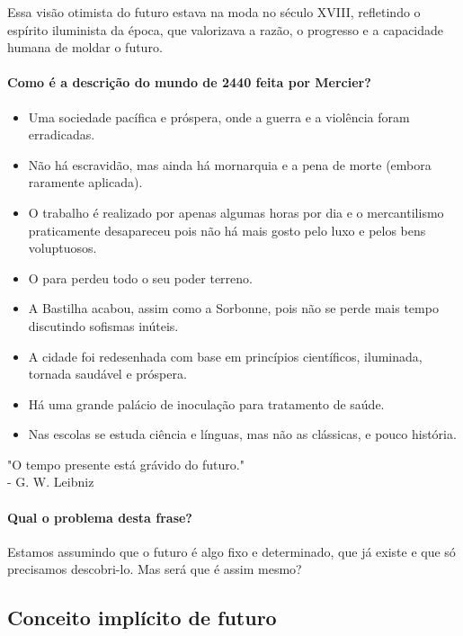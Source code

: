 Essa visão otimista do futuro estava na moda no século XVIII, refletindo o espírito iluminista da época, que valorizava a razão, o progresso e a capacidade humana de moldar o futuro.


\paragraph{Como é a descrição do mundo de 2440 feita por Mercier?}
\begin{itemize}
  \item Uma sociedade pacífica e próspera, onde a guerra e a violência foram erradicadas.
  \item Não há escravidão, mas ainda há mornarquia e a pena de morte (embora raramente aplicada).
  \item O trabalho é realizado por apenas algumas horas por dia e o mercantilismo praticamente desapareceu pois não há mais gosto pelo luxo e pelos bens voluptuosos.
  \item O para perdeu todo o seu poder terreno.
  \item A Bastilha acabou, assim como a Sorbonne, pois não se perde mais tempo discutindo sofismas inúteis.
  \item A cidade foi redesenhada com base em princípios científicos, iluminada, tornada saudável e próspera.
  \item Há uma grande palácio de inoculação para tratamento de saúde.
  \item Nas escolas se estuda ciência e línguas, mas não as clássicas, e pouco história.
\end{itemize}


\begin{thinkerquote}
  "O tempo presente está grávido do futuro."
  \\ \hfill - G. W. Leibniz
\end{thinkerquote}

\paragraph{Qual o problema desta frase?} Estamos assumindo que o futuro é algo fixo e determinado, que já existe e que só precisamos descobri-lo. Mas será que é assim mesmo?

\subsection*{Conceito implícito de futuro}

